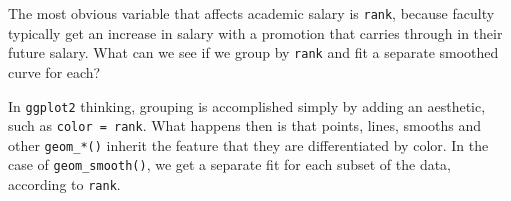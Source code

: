 \documentclass[
  letterpaper,
  10pt,
  krantz2]{krantz}
\makeatletter
\newenvironment{Shaded}{\begin{snugshade}}{\end{snugshade}}
\newcommand{\AttributeTok}[1]{\textcolor[rgb]{0.40,0.45,0.13}{#1}}
\newcommand{\CommentTok}[1]{\textcolor[rgb]{0.37,0.37,0.37}{#1}}
\newcommand{\DecValTok}[1]{\textcolor[rgb]{0.68,0.00,0.00}{#1}}
\newcommand{\FloatTok}[1]{\textcolor[rgb]{0.68,0.00,0.00}{#1}}
\newcommand{\FunctionTok}[1]{\textcolor[rgb]{0.28,0.35,0.67}{#1}}
\newcommand{\NormalTok}[1]{\textcolor[rgb]{0.00,0.23,0.31}{#1}}
\newcommand{\OtherTok}[1]{\textcolor[rgb]{0.00,0.23,0.31}{#1}}
\newcommand{\SpecialCharTok}[1]{\textcolor[rgb]{0.37,0.37,0.37}{#1}}
\newcommand{\StringTok}[1]{\textcolor[rgb]{0.13,0.47,0.30}{#1}}
\newenvironment{kframe}{%
  \medskip{}
  \setlength{\fboxsep}{.8em}
  \def\at@end@of@kframe{}%
  \ifinner\ifhmode%
  \def\at@end@of@kframe{\end{minipage}}%
  \begin{minipage}{\columnwidth}%
  \fi\fi%
  \def\FrameCommand##1{\hskip\@totalleftmargin \hskip-\fboxsep
  \colorbox{shadecolor}{##1}\hskip-\fboxsep
      \hskip-\linewidth \hskip-\@totalleftmargin \hskip\columnwidth}%
  \MakeFramed {\advance\hsize-\width
    \@totalleftmargin\z@ \linewidth\hsize
    \@setminipage}}%
{\par\unskip\endMakeFramed%
  \at@end@of@kframe}
\renewenvironment{Shaded}{\begin{kframe}}{\end{kframe}}
\makeatother
\begin{document}
The most obvious variable that affects academic salary is \texttt{rank},
because faculty typically get an increase in salary with a promotion
that carries through in their future salary. What can we see if we group
by \texttt{rank} and fit a separate smoothed curve for each?

In \texttt{ggplot2} thinking, grouping is accomplished simply by adding
an aesthetic, such as \texttt{color\ =\ rank}. What happens then is that
points, lines, smooths and other \texttt{geom\_*()} inherit the feature
that they are differentiated by color. In the case of
\texttt{geom\_smooth()}, we get a separate fit for each subset of the
data, according to \texttt{rank}.

\begin{Shaded}
\end{Shaded}
\end{document}
